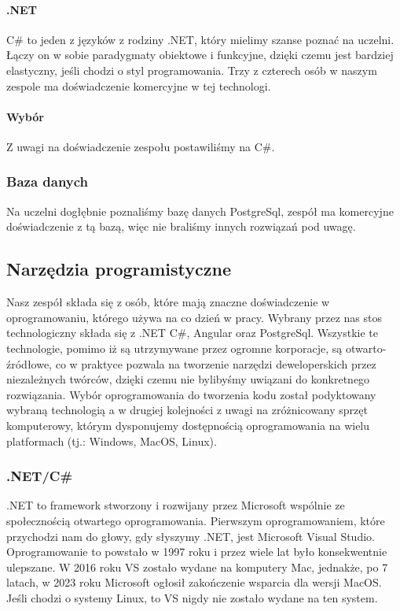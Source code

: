 \paragraph{.NET}
C\# to jeden z języków z rodziny .NET, który mielimy szanse poznać na uczelni.
Łączy on w sobie paradygmaty obiektowe i funkcyjne, dzięki czemu jest bardziej elastyczny, jeśli chodzi o styl programowania.
Trzy z czterech osób w naszym zespole ma doświadczenie komercyjne w tej technologi.

\paragraph{Wybór}
Z uwagi na doświadczenie zespołu postawiliśmy na C\#.

\subsubsection{Baza danych}
Na uczelni dogłębnie poznaliśmy bazę danych PostgreSql, zespół ma komercyjne doświadczenie z tą bazą, więc nie braliśmy innych rozwiązań pod uwagę.

\subsection{Narzędzia programistyczne}
\label{subsec:narzedzia-programistyczne}
Nasz zespół składa się z osób, które mają znaczne doświadczenie w oprogramowaniu, którego używa na co dzień w pracy.
Wybrany przez nas stos technologiczny składa się z .NET C\#, Angular oraz PostgreSql.
Wszystkie te technologie, pomimo iż są utrzymywane przez ogromne korporacje, są otwarto-źródłowe, co w praktyce pozwala na tworzenie narzędzi deweloperskich przez niezależnych twórców, dzięki czemu nie bylibyśmy uwiązani do konkretnego rozwiązania.
Wybór oprogramowania do tworzenia kodu został podyktowany wybraną technologią a w drugiej kolejności z uwagi na zróżnicowany sprzęt komputerowy, którym dysponujemy  dostępnością oprogramowania na wielu platformach (tj.: Windows, MacOS, Linux).

\subsubsection{.NET/C\#}
.NET to framework stworzony i rozwijany przez Microsoft wspólnie ze społecznością otwartego oprogramowania.
Pierwszym oprogramowaniem, które przychodzi nam do głowy, gdy słyszymy .NET, jest Microsoft Visual Studio.
Oprogramowanie to powstało w 1997 roku i przez wiele lat było konsekwentnie ulepszane.
W 2016 roku VS zostało wydane na komputery Mac, jednakże, po 7 latach, w 2023 roku Microsoft ogłosił zakończenie wsparcia dla wersji MacOS.
Jeśli chodzi o systemy Linux, to VS nigdy nie zostało wydane na ten system.

